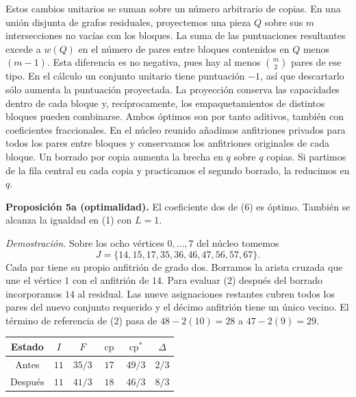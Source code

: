\documentclass[spanish,11pt,a4paper]{article}
\begin{document}
Estos cambios unitarios se suman sobre un número arbitrario de copias. En una unión disjunta de grafos residuales, proyectemos una pieza \(Q\) sobre sus \(m\) intersecciones no vacías con los bloques. La suma de las puntuaciones resultantes excede a \(w(Q)\) en el número de pares entre bloques contenidos en \(Q\) menos \((m-1)\). Esta diferencia es no negativa, pues hay al menos \(\binom m2\) pares de ese tipo. En el cálculo un conjunto unitario tiene puntuación \(-1\), así que descartarlo sólo aumenta la puntuación proyectada. La proyección conserva las capacidades dentro de cada bloque y, recíprocamente, los empaquetamientos de distintos bloques pueden combinarse. Ambos óptimos son por tanto aditivos, también con coeficientes fraccionales. En el núcleo reunido añadimos anfitriones privados para todos los pares entre bloques y conservamos los anfitriones originales de cada bloque. Un borrado por copia aumenta la brecha en \(q\) sobre \(q\) copias. Si partimos de la fila central en cada copia y practicamos el segundo borrado, la reducimos en \(q\).

\textbf{Proposición 5a (optimalidad).} El coeficiente dos de (6) es óptimo. También se alcanza la igualdad en (1) con \(L=1\).

\emph{Demostración.} Sobre los ocho vértices \(0,\ldots,7\) del núcleo tomemos \[
J=\{14,15,17,35,36,46,47,56,57,67\}.
\] Cada par tiene su propio anfitrión de grado dos. Borramos la arista cruzada que une el vértice \(1\) con el anfitrión de \(14\). Para evaluar (2) después del borrado incorporamos \(14\) al residual. Las nueve asignaciones restantes cubren todos los pares del nuevo conjunto requerido y el décimo anfitrión tiene un único vecino. El término de referencia de (2) pasa de \(48-2(10)=28\) a \(47-2(9)=29\).

\begin{center}
\begin{tabular}{cccccc}
\toprule
Estado & $I$ & $F$ & $\operatorname{cp}$ & $\operatorname{cp}^{\ast}$ & $\Delta$ \\
\midrule
Antes & $11$ & $35/3$ & $17$ & $49/3$ & $2/3$ \\
Después & $11$ & $41/3$ & $18$ & $46/3$ & $8/3$ \\
\bottomrule
\end{tabular}
\end{center}
\end{document}

